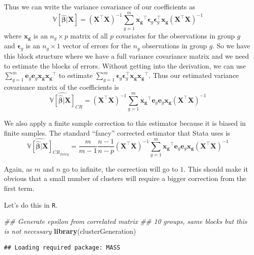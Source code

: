 \documentclass[]{article}
\newenvironment{Shaded}{\begin{snugshade}}{\end{snugshade}}
\newcommand{\CommentTok}[1]{\textcolor[rgb]{0.56,0.35,0.01}{\textit{#1}}}
\newcommand{\KeywordTok}[1]{\textcolor[rgb]{0.13,0.29,0.53}{\textbf{#1}}}
\newcommand{\NormalTok}[1]{#1}
\begin{document}
Thus we can write the variance covariance of our coefficients as
\[\mathbb{V}[\hat{\bm{\beta}}|\mathbf{X}] = (\mathbf{X}^\top \mathbf{X})^{-1} \sum^m_{g=1}\mathbf{x_g}^\top \bm{\epsilon}_g \bm{\epsilon}^\top_g \mathbf{x_g} (\mathbf{X}^\top \mathbf{X})^{-1}\]
where \(\mathbf{x_g}\) is an \(n_g \times p\) matrix of all \(p\)
covariates for the observations in group \(g\) and \(\bm{\epsilon}_g\)
is an \(n_g \times 1\) vector of errors for the \(n_g\) observations in
group \(g\). So we have this block structure where we have a full
variance covariance matrix and we need to estimate the blocks of errors.
Without getting into the derivation, we can use
\(\sum^m_{g=1} \mathbf{e}_g \mathbf{e}_g \mathbf{x_g}\mathbf{x_g}^\top\)
to estimate
\(\sum^m_{g=1} \bm{\epsilon}_g \bm{\epsilon}^\top_g \mathbf{x_g}\mathbf{x_g}^\top\).
Thus our estimated variance covariance matrix of the coefficients is
\[\widehat{\mathbb{V}[\hat{\bm{\beta}}|\mathbf{X}]}_{CR} = (\mathbf{X}^\top \mathbf{X})^{-1} \sum^m_{g=1}\mathbf{x_g}^\top \mathbf{e}_g \mathbf{e}_g \mathbf{x_g} (\mathbf{X}^\top \mathbf{X})^{-1}\]

We also apply a finite sample correction to this estimator because it is
biased in finite samples. The standard ``fancy'' corrected estimator
that Stata uses is
\[\widehat{\mathbb{V}[\hat{\bm{\beta}}|\mathbf{X}]}_{CR_{fancy}} = \frac{m}{m-1}\frac{n-1}{n-p}(\mathbf{X}^\top \mathbf{X})^{-1} \sum^m_{g=1}\mathbf{x_g}^\top \mathbf{e}_g \mathbf{e}_g \mathbf{x_g} (\mathbf{X}^\top \mathbf{X})^{-1}\]

Again, as \(m\) and \(n\) go to infinite, the correction will go to
\(1\). This should make it obvious that a small number of clusters will
require a bigger correction from the first term.

Let's do this in \texttt{R}.

\begin{Shaded}
\begin{Highlighting}[]
\CommentTok{## Generate epsilon from correlated matrix }
\CommentTok{## 10 groups, same blocks but this is not necessary}
\KeywordTok{library}\NormalTok{(clusterGeneration)}
\end{Highlighting}
\end{Shaded}

\begin{verbatim}
## Loading required package: MASS
\end{verbatim}
\end{document}
